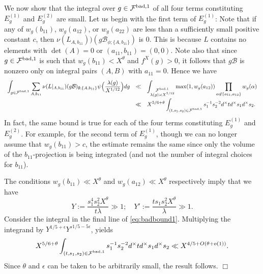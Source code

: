 \documentclass{article}
\def\bad{{\rm bad}}
\def\cB{{\mathcal B}}
\def\FF{{\mathcal F}}
\newenvironment{proof}{\noindent {\bf Proof:}}{$\Box$ \vspace{2 ex}}
\begin{document}
\begin{proof}
We now show that the integral over $g\in\FF^{\bad,1}$ of all four
terms constituting $E_g^{(1)}$ and $E_g^{(2)}$ are small.
Let us begin
with the first term of $E_g^{(1)}$: Note that if any of $w_g(b_{11})$, $w_g(a_{12})$, or $w_g(a_{22})$ are less than a sufficiently small positive constant $c$, then
$\nu(L_{A,b_{11}}))(g\cB_{\phi;\{A,b_{11}\}})$ is $0$. This is because $L$ contains no elements with $\det(A)=0$ or $(a_{11},b_{11})=(0,0)$.
Note also that since $g\in\FF^{\bad,1}$ is such that $w_g(b_{11})<X^\theta$ and $f^X(g)>0$, it follows that $g\cB$ is nonzero only on integral pairs $(A,B)$ with $a_{11}=0$. Hence we have
\begin{equation}\label{eq:badbound1}
\begin{array}{rcl}
  \displaystyle  \int_{\substack{g\in\FF^{\bad,1}}}\sum_{A,b_{11}}\nu(L|_{A,b_{11}})(g\cB)_{\emptyset;\{A,b_{11}\}}\psi\Bigl(
\frac{\lambda(g)}{X^{1/12}}
\Bigr)dg&\ll& \displaystyle\int_{\substack{\FF^{\bad,1}\\\lambda(g)\asymp X^{1/12}}}\max(1,w_g(a_{12}))\prod_{\alpha\not\in\{a_{11},a_{12}\}}w_g(\alpha)
\\[.2in]&\ll&\displaystyle
X^{5/6+\theta}\int_{\substack{(t,s_1,s_2)\in\FF^{\bad,1}}}s_1^{-1}s_2^{-2}d^\times td^\times s_1 d^\times s_2.
\end{array}
\end{equation}
In fact, the same bound is true for each of the four terms
constituting $E_g^{(1)}$ and $E_g^{(2)}$. For example, for the second
term of $E_g^{(1)}$, though we can no longer assume that
$w_g(b_{11})>c$, the estimate remains the same since only the volume of the $b_{11}$-projection is being integrated (and not the number of integral choices for $b_{11}$).

The conditions $w_g(b_{11})\ll X^\theta$ and $w_g(a_{12})\ll X^\theta$
respectively imply that we have
\begin{equation*}
Y:=\frac{s_1^4s_2^2 X^\theta}{t\lambda}\gg 1;\quad
Y':=\frac{ts_1s_2^2 X^\theta}{\lambda}\gg 1.
\end{equation*}
Consider the integral in the final line of
\eqref{eq:badbound1}. Multiplying the integrand
by $Y^{1/5+\epsilon}Y'^{1/5-5\epsilon}$, yields
\begin{equation*}
  X^{5/6+\theta}\int_{\substack{(t,s_1,s_2)\in\FF^{\bad,1}}}s_1^{-1}s_2^{-2}d^\times td^\times s_1 d^\times s_2
\ll X^{4/5+O(\theta+o(1))}.
\end{equation*}
Since $\theta$ and $\epsilon$ can be taken to be arbitrarily small, the result follows.
\end{proof}
\end{document}
